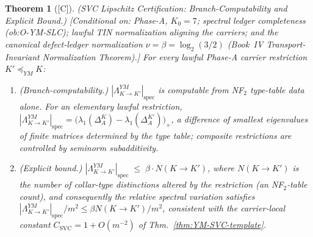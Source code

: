 \documentclass[12pt,oneside]{amsbook}
\theoremstyle{plain}
\newtheorem{theorem}{Theorem}[section]
\theoremstyle{definition}
\theoremstyle{remark}
\newcommand{\status}[1]{\textup{[#1]}}
\begin{document}
\begin{theorem}[\status{C}]\label{thm:YM-SVC-Lip}
\textup{(SVC Lipschitz Certification: Branch-Computability and
Explicit Bound.)}
\textup{[Conditional on: Phase-A, $K_0 = 7$; spectral ledger
completeness (ob:O-YM-SLC); lawful TIN normalization aligning the
carriers; and the canonical defect-ledger normalization
$\nu = \beta = \log_2(3/2)$ (Book~IV Transport-Invariant
Normalization Theorem).]}
For every lawful Phase-A carrier restriction $K' \preceq_{YM} K$:
\begin{enumerate}[label=\textup{(\alph*)}]
  \item\label{svclip:comp} \emph{(Branch-computability.)}
        $|\Lambda_{K \to K'}^{YM}|_{\mathrm{spec}}$ is computable
        from NF$_2$ type-table data alone.  For an elementary lawful
        restriction,
        $|\Lambda_{K \to K'}^{YM}|_{\mathrm{spec}}
        = \bigl(\lambda_1(\Delta_A^K) -
        \lambda_1(\Delta_A^{K'})\bigr)_{+}$,
        a difference of smallest eigenvalues of finite matrices
        determined by the type table; composite restrictions are
        controlled by seminorm subadditivity.
  \item\label{svclip:bound} \emph{(Explicit bound.)}
        $|\Lambda_{K \to K'}^{YM}|_{\mathrm{spec}} \;\le\;
        \beta \cdot N(K \to K')$,
        where $N(K \to K')$ is the number of collar-type
        distinctions altered by the restriction (an NF$_2$-table
        count), and consequently the relative spectral variation
        satisfies
        $|\Lambda_{K \to K'}^{YM}|_{\mathrm{spec}} / m^2
        \le \beta N(K \to K') / m^2$,
        consistent with the carrier-local constant
        $C_{\mathrm{SVC}} = 1 + O(m^{-2})$ of
        Thm.~\ref{thm:YM-SVC-template}.
\end{enumerate}
\end{theorem}
\end{document}
